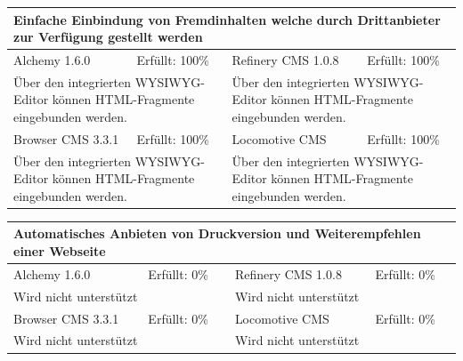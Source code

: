 \newline
\newline
\newline
\begin{tabular}[!ht]{|l|l|l|l|}
\hline
\multicolumn{4}{|p{15cm}|}{\textbf{Einfache Einbindung von Fremdinhalten welche durch Drittanbieter zur Verfügung gestellt werden}} \\
\hline
  Alchemy 1.6.0 & \cellcolor{green}Erfüllt: 100\% & Refinery CMS 1.0.8 & \cellcolor{green}Erfüllt: 100\% \\
  \hline
  \multicolumn{2}{|p{7.5cm}|}{Über den integrierten WYSIWYG-Editor können HTML-Fragmente eingebunden werden.} & \multicolumn{2}{p{7.5cm}|}{Über den integrierten WYSIWYG-Editor können HTML-Fragmente eingebunden werden.} \\
  \hline
  Browser CMS 3.3.1 & \cellcolor{green}Erfüllt: 100\% & Locomotive CMS & \cellcolor{green}Erfüllt: 100\% \\
  \hline
  \multicolumn{2}{|p{7.5cm}|}{Über den integrierten WYSIWYG-Editor können HTML-Fragmente eingebunden werden.} & \multicolumn{2}{p{7.5cm}|}{Über den integrierten WYSIWYG-Editor können HTML-Fragmente eingebunden werden.} \\
\hline
\end{tabular}
\newline
\newline
\newline
\begin{tabular}[!ht]{|l|l|l|l|}
\hline
\multicolumn{4}{|p{15cm}|}{\textbf{Automatisches Anbieten von Druckversion und Weiterempfehlen einer Webseite}} \\
\hline
  Alchemy 1.6.0 & \cellcolor{red}Erfüllt: 0\% & Refinery CMS 1.0.8 & \cellcolor{red}Erfüllt: 0\% \\
  \hline
  \multicolumn{2}{|p{7.5cm}|}{Wird nicht unterstützt} & \multicolumn{2}{p{7.5cm}|}{Wird nicht unterstützt} \\
  \hline
  Browser CMS 3.3.1 & \cellcolor{red}Erfüllt: 0\% & Locomotive CMS & \cellcolor{red}Erfüllt: 0\% \\
  \hline
  \multicolumn{2}{|p{7.5cm}|}{Wird nicht unterstützt} & \multicolumn{2}{p{7.5cm}|}{Wird nicht unterstützt} \\
\hline
\end{tabular}
